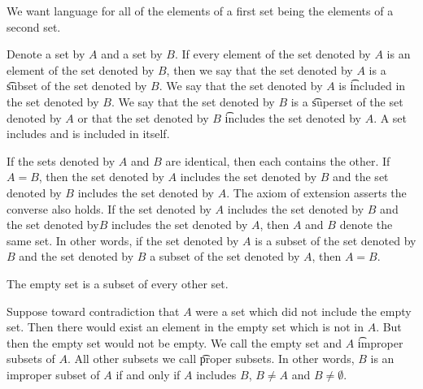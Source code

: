 

We want language for all of the elements of a first set being the elements of a second set.


Denote a set by $A$ and a set by $B$.
If every element of the set denoted by $A$ is an element of the set denoted by $B$, then we say that the set denoted by $A$ is a \t{subset} of the set denoted by $B$.
We say that the set denoted by $A$ is \t{included} in the set denoted by $B$.
We say that the set denoted by $B$ is a \t{superset} of the set denoted by $A$ or that the set denoted by $B$ \t{includes} the set denoted by $A$.
A set includes and is included in itself.

If the sets denoted by $A$ and $B$ are identical, then each contains the other.
If $A = B$, then the set denoted by $A$ includes the set denoted by $B$ and the set denoted by $B$ includes the set denoted by $A$.
The axiom of extension asserts the converse also holds.
If the set denoted by $A$ includes the set denoted by $B$ and the set denoted by$B$ includes the set denoted by $A$, then $A$ and $B$ denote the same set.
In other words, if the set denoted by $A$ is a subset of the set denoted by $B$ and the set denoted by $B$ a subset of the set denoted by $A$, then $A = B$.

The empty set is a subset of every other set.

\begin{account}
\end{account}

Suppose toward contradiction that $A$ were a set which did not include the empty set.
Then there would exist an element in the empty set which is not in $A$.
But then the empty set would not be empty.
We call the empty set and $A$ \t{improper subsets} of $A$.
All other subsets we call \t{proper subsets}.
In other words, $B$ is an improper subset of $A$ if and only if $A$ includes $B$, $B \neq A$ and $B \neq \emptyset$.

